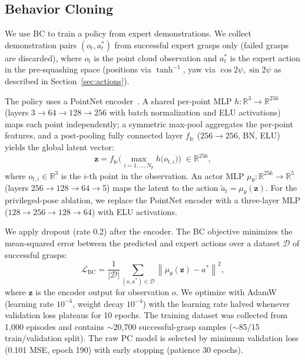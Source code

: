 \documentclass[letterpaper, 10 pt, conference]{ieeeconf}
\begin{document}
\subsection{Behavior Cloning}
\label{sec:bc}
We use BC to train a policy from expert demonstrations.
We collect demonstration pairs $(o_t, a_t^*)$ from successful expert grasps only (failed grasps are discarded), where $o_t$ is the point cloud observation and $a_t^*$ is the expert action in the pre-squashing space (positions via $\tanh^{-1}$, yaw via $\cos 2\psi, \sin 2\psi$ as described in Section~\ref{sec:actions}).

The policy uses a PointNet encoder~\cite{qi2017pointnet}.
A shared per-point MLP $h: \mathbb{R}^3 \to \mathbb{R}^{256}$ (layers $3 \!\to\! 64 \!\to\! 128 \!\to\! 256$ with batch normalization and ELU activations) maps each point independently; a symmetric max-pool aggregates the per-point features, and a post-pooling fully connected layer $f_{\mathrm{fc}}$ ($256 \!\to\! 256$, BN, ELU) yields the global latent vector:
\begin{equation}
    \mathbf{z} = f_{\mathrm{fc}}\!\Big(\max_{i=1,\ldots,N_p} h\!\big(o_{t,i}\big)\Big) \;\in \mathbb{R}^{256},
\end{equation}
where $o_{t,i} \in \mathbb{R}^3$ is the $i$-th point in the observation.
An actor MLP $\mu_\theta: \mathbb{R}^{256} \to \mathbb{R}^{5}$ (layers $256 \!\to\! 128 \!\to\! 64 \!\to\! 5$) maps the latent to the action $\tilde{a}_t = \mu_\theta(\mathbf{z})$.
For the privileged-pose ablation, we replace the PointNet encoder with a three-layer MLP ($128 \!\to\! 256 \!\to\! 128 \!\to\! 64$) with ELU activations.

We apply dropout (rate 0.2) after the encoder.
The BC objective minimizes the mean-squared error between the predicted and expert actions over a dataset $\mathcal{D}$ of successful grasps:
\begin{equation}
    \mathcal{L}_{\text{BC}} = \frac{1}{|\mathcal{D}|}\sum_{(o,a^*)\in\mathcal{D}} \left\| \mu_\theta(\mathbf{z}) - a^* \right\|^2,
\end{equation}
where $\mathbf{z}$ is the encoder output for observation $o$.
We optimize with AdamW~\cite{loshchilov2019adamw} (learning rate $10^{-4}$, weight decay $10^{-4}$) with the learning rate halved whenever validation loss plateaus for 10 epochs.
The training dataset was collected from 1{,}000 episodes and contains $\sim$20{,}700 successful-grasp samples ($\sim$85/15 train/validation split). The raw PC model is selected by minimum validation loss (0.101 MSE, epoch 190) with early stopping (patience 30 epochs).
\end{document}

